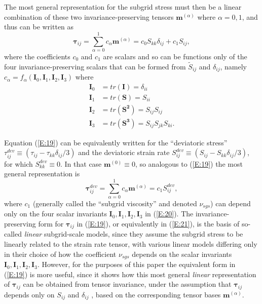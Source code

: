 The most general representation for the subgrid stress must then be a linear combination of these two invariance-preserving tensors $\mathbf{m}^{(\alpha)}$  where $\alpha = 0,1$, and thus can be written as 
%
\begin{equation}
\label{E:19}
	\mathbf{\tau}_{ij} = \sum_{\alpha=0}^{1} c_{\alpha} \mathbf{m}^{(\alpha)}
	= c_0 S_{kk} \delta_{ij} + c_1 S_{ij},
\end{equation}
%
%        
where the coefficients $c_0$  and $c_1$  are scalars and so can be functions only of the four invariance-preserving scalars that can be formed from  $\widetilde{S}_{ij}$ and $\delta_{ij}$, namely  $c_{\alpha} = f_{\alpha} (\mathbf{I}_0, \mathbf{I}_1, \mathbf{I}_2,
\mathbf{I}_3)$ where 
%
\begin{subequations}
\label{E:20}
\begin{align}
	\mathbf{I}_{0} &= tr(\mathbf{I})   = \delta_{ii} \\
	\mathbf{I}_{1} &= tr(\mathbf{S})   = S_{ii} \\
	\mathbf{I}_{2} &= tr(\mathbf{S^2}) = S_{ij}S_{ij} \\
	\mathbf{I}_{3} &= tr(\mathbf{S^3}) = S_{ij}S_{jk}S_{ki}. 
\end{align}
\end{subequations}
%
%   

Equation (\ref{E:19}) can be equivalently written for the ``deviatoric stress''  $\tau_{ij}^{dev} \equiv (\tau_{ij} - \tau_{kk}\delta_{ij}/3)$ and the deviatoric strain rate  $S_{ij}^{dev} \equiv (S_{ij} - S_{kk}\delta_{ij}/3)$, for which $S_{kk}^{dev} \equiv 0$. In that case $\mathbf{m}^{(0)} \equiv 0$, so analogous to (\ref{E:19}) the most general representation is
%
\begin{equation}
\label{E:21}
	\mathbf{\tau}_{ij}^{dev} = \sum_{\alpha=0}^{1} c_{\alpha} \mathbf{m}^{(\alpha)}
	= c_1 S_{ij}^{dev},
\end{equation}
%
%     
where  $c_1$ (generally called the ``subgrid viscosity'' and denoted $\nu_{sgs}$) can depend only on the four scalar invariants $\mathbf{I}_{0}, \mathbf{I}_{1}, \mathbf{I}_{2}, \mathbf{I}_{3}$  in (\ref{E:20}). The invariance-preserving form for $\mathbf{\tau}_{ij}$  in (\ref{E:19}), or equivalently in (\ref{E:21}), is the basis of so-called \textit{linear} subgrid-scale models, since they assume the subgrid stress to be linearly related to the strain rate tensor, with various linear models differing only in their choice of how the coefficient  $\nu_{sgs}$ depends on the scalar invariants $\mathbf{I}_{0}, \mathbf{I}_{1}, \mathbf{I}_{2}, \mathbf{I}_{3}$.  However, for the purposes of this paper the equivalent form in (\ref{E:19}) is more useful, since it shows how this most general \textit{linear} representation of $\mathbf{\tau}_{ij}$  can be obtained from tensor invariance, under the assumption that $\mathbf{\tau}_{ij}$  depends only on $S_{ij}$  and $\delta_{ij}$ , based on the corresponding tensor bases $\mathbf{m}^{(\alpha)}$. 
 

